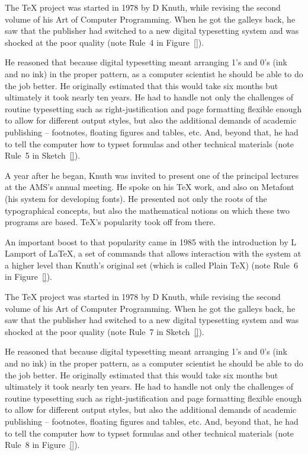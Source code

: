 \documentclass[12pt]{book}
\begin{document}
The TeX project was started in 1978 by D Knuth, while revising the second volume of his Art of Computer Programming. When he got the
galleys back, he saw that the publisher had switched to a new digital typesetting system and was shocked at the poor quality (note Rule~4 in Figure~\ref{}).


He reasoned that because digital typesetting meant arranging 1's and 0's (ink and no ink) in the proper pattern, as a computer scientist
he should be able to do the job better. He originally estimated that this would take six months but ultimately it took nearly ten years.
He had to handle not only the challenges of routine typesetting such as right-justification and page formatting flexible enough to allow
for different output styles, but also the additional demands of academic publishing -- footnotes, floating figures and tables, etc. And,
beyond that, he had to tell the computer how to typset formulas and other technical materials (note Rule~5 in Sketch~\ref{}).


A year after he began, Knuth was invited to present one of the principal lectures at the AMS's annual meeting. He spoke on his TeX work,
and also on Metafont (his system for developing fonts). He presented not only the roots of the typographical concepts, but also the
mathematical notions on which these two programs are based. TeX's popularity took off from there.

An important boost to that popularity came in 1985 with the introduction by L Lamport of LaTeX, a set of commands that allows interaction
with the system at a higher level than Knuth's original set (which is called Plain TeX) (note Rule~6 in Figure~\ref{}).


The TeX project was started in 1978 by D Knuth, while revising the second volume of his Art of Computer Programming. When he got the
galleys back, he saw that the publisher had switched to a new digital typesetting system and was shocked at the poor quality (note Rule~7 in Sketch~\ref{}).


He reasoned that because digital typesetting meant arranging 1's and 0's (ink and no ink) in the proper pattern, as a computer scientist
he should be able to do the job better. He originally estimated that this would take six months but ultimately it took nearly ten years.
He had to handle not only the challenges of routine typesetting such as right-justification and page formatting flexible enough to allow
for different output styles, but also the additional demands of academic publishing -- footnotes, floating figures and tables, etc. And,
beyond that, he had to tell the computer how to typset formulas and other technical materials (note Rule~8 in Figure~\ref{}).
\end{document}
